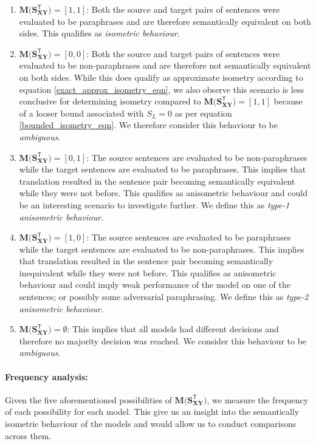 \documentclass[11pt,a4paper]{article}
\begin{document}
\begin{enumerate}
  \item $\mathbf{M(S_{XY}^{\mathsf{T}}}) = [1, 1]$: Both the source and target
  pairs of sentences were evaluated to be paraphrases and are therefore
  semantically equivalent on both sides. This qualifies as \textit{isometric
    behaviour}.
  \item $\mathbf{M(S_{XY}^{\mathsf{T}}}) = [0, 0]$: Both the source and target
  pairs of sentences were evaluated to be non-paraphrases and are therefore not
  semantically equivalent on both sides. While this does qualify as approximate
  isometry according to equation \ref{exact_approx_isometry_eqn}, we also
  observe this scenario is less conclusive for determining isometry compared to
  $\mathbf{M(S_{XY}^{\mathsf{T}}}) = [1, 1]$ because of a looser bound
  associated with $S_L=0$ as per equation \ref{bounded_isometry_eqn}. We
  therefore consider this behaviour to be \textit{ambiguous}.
  \item $\mathbf{M(S_{XY}^{\mathsf{T}}}) = [0, 1]$: The source sentences are
  evaluated to be non-paraphrases while the target sentences are evaluated to be
  paraphrases. This implies that translation resulted in the sentence pair
  becoming semantically equivalent while they were not before. This qualifies as
  anisometric behaviour and could be an interesting scenario to investigate
  further. We define this as \textit{type-1 anisometric behaviour}.
  \item $\mathbf{M(S_{XY}^{\mathsf{T}}}) = [1, 0]$: The source sentences are
  evaluated to be paraphrases while the target sentences are evaluated to be
  non-paraphrases. This implies that translation resulted in the sentence pair
  becoming semantically inequivalent while they were not before. This qualifies
  as anisometric behaviour and could imply weak performance of the model on one
  of the sentences; or possibly some adversarial paraphrasing. We define this as
  \textit{type-2 anisometric behaviour}.
  \item $\mathbf{M(S_{XY}^{\mathsf{T}}}) = \emptyset$: This implies that all
  models had different decisions and therefore no majority decision was reached.
  We consider this behaviour to be \textit{ambiguous}.
\end{enumerate}

\paragraph{Frequency analysis:} Given the five aforementioned possibilities of
$\mathbf{M(S_{XY}^{\mathsf{T}}})$, we measure the frequency of each possibility
for each model. This give us an insight into the semantically isometric
behaviour of the models and would allow us to conduct comparisons across them.
\end{document}
